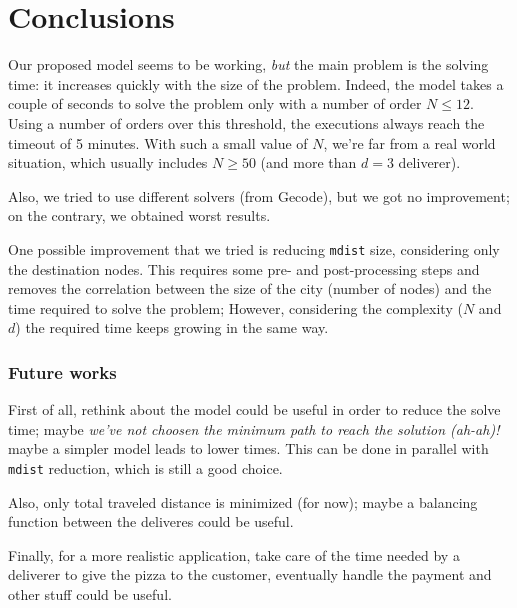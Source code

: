 \documentclass[10pt]{article}
\begin{document}
	\section{Conclusions} 
	\label{sec:conclusions}
	Our proposed model seems to be working, \textit{but} the main problem is the solving time: 
	it increases quickly 
	with the size of the problem. Indeed, the model takes a couple of seconds to solve the problem
	only with a number of order $N \le 12$. Using a number of orders over this threshold, 
	the executions always reach the timeout of 5 minutes. With such a small value of $N$,
	we're far from a real world situation, which usually includes $N \ge 50$ (and more
	than $d = 3$ deliverer).

	Also, we tried to use different solvers (from Gecode), but we got no improvement; 
	on the contrary, we obtained worst results.

	One possible improvement that we tried is reducing \texttt{mdist} size, considering
	only the destination nodes.
	This requires some pre- and post-processing steps and removes the correlation between
	the size of the city (number of nodes) and the time required to solve the problem; 
	However, considering the complexity ($N$ and $d$) the required time keeps growing 
	in the same way.


	\subsubsection*{Future works}
	\label{Future work}

	First of all, rethink about the model could be useful in order to reduce the solve time;
	maybe \textit{we've not choosen the minimum path to reach the solution (ah-ah)!} maybe a 
	simpler model leads to 
	lower times. This can be done in parallel with \texttt{mdist} reduction, which is still 
	a good choice.

	Also, only total traveled distance is minimized (for now); maybe a balancing 
	function between the deliveres could be useful.

	Finally, for a more realistic application, take care of the time 
	needed by a deliverer to give the pizza to the customer, eventually handle 
	the payment and other stuff could be useful.
	
	
\end{document}
